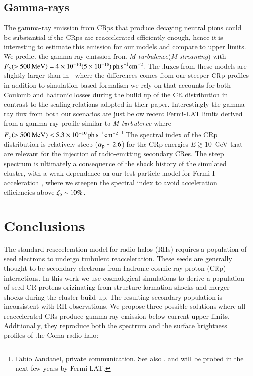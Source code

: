 \documentclass[fleqn,usenatbib,useAMS]{mnras}
\newcommand{\Mstream}{{\it M-streaming}\xspace}
\newcommand{\Mflatturb}{{\it M-turbulence}\xspace}
\begin{document}
\subsection{Gamma-rays}
The gamma-ray emission from CRps that produce decaying neutral pions
could be substantial if the CRps are reaccelerated efficiently enough,
hence it is interesting to estimate this emission for our models and
compare to upper limits. We predict the gamma-ray emission from
\Mflatturb (\Mstream) with $F_\gamma(>500\,{\mathrm{MeV}})=4\times10^{-10}
(5\times10^{-10}) \mathrm{ \,ph\, s}^{-1}\mathrm{cm}^{-2}$. The fluxes
from these models are slightly larger than in \cite{brunetti12}, where
the differences comes from our steeper CRp profiles in addition to
simulation based formalism we rely on that accounts for both Coulomb
and hadronic losses during the build up of the CR distribution in
contrast to the scaling relations adopted in their
paper. Interestingly the gamma-ray flux from both our scenarios are
just below recent Fermi-LAT limits derived from a gamma-ray profile
similar to \Mflatturb where
$F_\gamma(>500\,{\mathrm{MeV}})<5.3\times10^{-10} \mathrm{ \,ph\,
  s}^{-1}\mathrm{cm}^{-2}$ \footnote{Fabio Zandanel, private
  communication. See also
  \citet{2014MNRAS.440..663Z,2014ApJ...787...18A}. and will be probed
  in the next few years by Fermi-LAT. } The spectral index of the CRp
distribution is relatively steep ($\alpha_{{\mathrm{p}}}\sim2.6$) for the
CRp energies $E \gtrsim 10$~GeV that are relevant for the injection of
radio-emitting secondary CRes. The steep spectrum is ultimately a
consequence of the shock history of the simulated cluster, with a weak
dependence on our test particle model for Fermi-I acceleration
\citep{pinzke13}, where we steepen the spectral index to avoid
acceleration efficiencies above $\zeta_{{\mathrm{p}}} \sim 10\%$.


\section{Conclusions}
\label{sec:conclusions}

The standard reacceleration model for radio halos (RHs) requires a
population of seed electrons to undergo turbulent
reacceleration. These seeds are generally thought to be secondary
electrons from hadronic cosmic ray proton (CRp) interactions. In this
work we use cosmological simulations to derive a population of seed CR
protons originating from structure formation shocks and merger shocks
during the cluster build up. The resulting secondary population is
inconsistent with RH observations. We propose three possible solutions
where all reaccelerated CRs produce gamma-ray emission below current
upper limits. Additionally, they reproduce both the spectrum and the
surface brightness profiles of the Coma radio halo:
\end{document}
